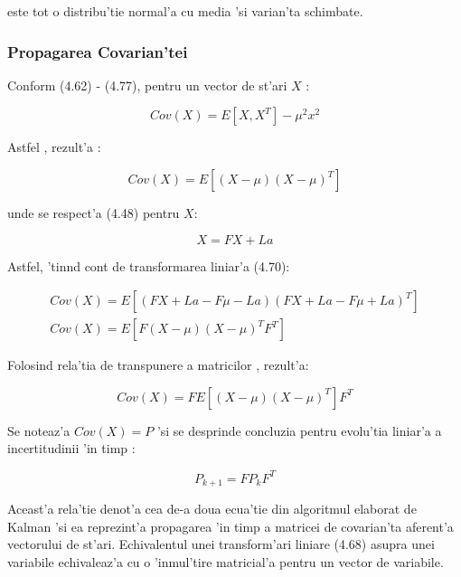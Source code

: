\documentclass[12pt,a4paper,twoside]{report}
\begin{document}
este tot o distribu'tie normal'a cu media 'si varian'ta schimbate. 
\subsubsection{Propagarea Covarian'tei}

Conform (4.62) - (4.77), pentru un vector de st'ari $X$ \cite{10.1115/1.3662552}:

\begin{equation}
    Cov(X) = E[X,X^T] - \mu ^ 2 x ^ 2
\end{equation}

Astfel , rezult'a \cite{VarCoVar} \cite{Covariance}:

\begin{equation}
    Cov(X) = E[(X - \mu) (X - \mu)^T]
\end{equation}

unde se respect'a (4.48) pentru $X$:

\begin{equation}
    X = FX + La
\end{equation}

Astfel, 'tin\ia nd cont de transformarea liniar'a (4.70):

\begin{gather}
    Cov(X) = E[(FX + La - F\mu - La) (FX + La - F\mu + La)^T] \\
    Cov(X) = E[F(X - \mu) (X - \mu)^T F^T]
\end{gather}

Folosind rela'tia de transpunere a matricilor \cite{Covariance}, rezult'a:

\begin{equation}
    Cov(X) = F E[(X - \mu) (X - \mu)^T]F^T
\end{equation}

Se noteaz'a $Cov(X) = P$ 'si se desprinde concluzia pentru evolu'tia liniar'a a incertitudinii 'in timp \cite{Covariance}:

\begin{equation}
    P_{k+1} = F P_k F^T
\end{equation}

Aceast'a rela'tie denot'a cea de-a doua ecua'tie din algoritmul elaborat de Kalman 'si ea reprezint'a propagarea 'in timp a matricei de covarian'ta aferent'a vectorului de st'ari. Echivalentul unei transform'ari liniare (4.68) asupra unei variabile echivaleaz'a cu o 'inmul'tire matricial'a pentru un vector de variabile. 

\vspace{5px}
\end{document}

